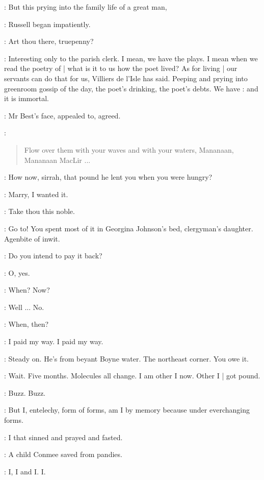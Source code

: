 \AErussell:
But this prying into the family life of a great man,

:
Russell began impatiently.

\StephenInt:
Art thou there,
truepenny?

\AErussell:
Interesting only to the parish clerk.
I mean,
we have the plays.
I mean when we read the poetry of  |
what is it to us how the poet lived?
As for living |
our servants can do that for us,
Villiers de l'Isle has said.
Peeping and prying into greenroom gossip of the day,
the poet's drinking,
the poet's debts.
We have :
and it is immortal.

:
Mr Best's face,
appealed to,
agreed.

\best:
\begin{verse}
    Flow over them with your waves and with your waters, Mananaan,
 \\
    Mananaan MacLir ...
\end{verse}

\StephenInt:
How now,
sirrah,
that pound he lent you when you were hungry?

\StephenInt:
Marry,
I wanted it.

\StephenInt:
Take thou this noble.

\StephenInt:
Go to!
You spent most of it in Georgina Johnson's bed,
clergyman's daughter.
Agenbite of inwit.

\StephenInt:
Do you intend to pay it back?

\StephenInt:
O, yes.

\StephenInt:
When?
Now?

\StephenInt:
Well ...
No.

\StephenInt:
When,
then?

\StephenInt:
I paid my way.
I paid my way.

\StephenInt:
Steady on.
He's from beyant Boyne water.
The northeast corner.
You owe it.

\StephenInt:
Wait.
Five months.
Molecules all change.
I am other I now.
Other I |
got pound.

\StephenInt:
Buzz.
Buzz.

\StephenInt:
But I,
entelechy,
form of forms,
am I by memory because under everchanging forms.

\StephenInt:
I that sinned and prayed and fasted.

\StephenInt:
A child Conmee saved from pandies.

\StephenInt:
I, I and I.
I.

